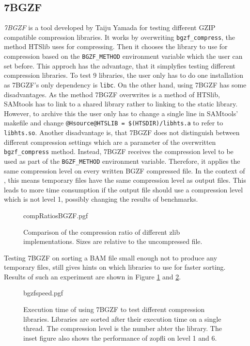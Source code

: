 \subsection{7BGZF}
\textit{7BGZF} \cite{yamada_7bgzf_2020} is a tool developed by Taiju Yamada for testing different GZIP compatible compression libraries. It works by overwriting \texttt{bgzf\_compress}, the method HTSlib uses for compressing. Then it chooses the library to use for compression based on the \texttt{BGZF\_METHOD} environment variable which the user can set before. This approch has the advantage, that it simplyfies testing different compression libraries. To test 9 libraries, the user only has to do one installation as 7BGZF's only dependency is \texttt{libc}. On the other hand, using 7BGZF has some disadvantages. As the method 7BGZF overwrites is a method of HTSlib, SAMtools has to link to a shared library rather to linking to the static library. However, to archive this the user only has to change a single line in SAMtools' makefile and change \texttt{@Hsource@HTSLIB = \$(HTSDIR)/libhts.a} to refer to \texttt{libhts.so}. Another disadvantage is, that 7BGZF does not distinguish between different compression settings which are a parameter of the overwritten \texttt{bgzf\_compress} method. Instead, 7BGZF receives the compression level to be used as part of the \texttt{BGZF\_METHOD} environment variable. Therefore, it applies the same compression level on every written BGZF compressed file. In the context of \sort, this means temporary files have the same compression level as output files. This leads to more time consumption if the output file should use a compression level which is not level 1, possibly changing the results of benchmarks. \\
\begin{figure}
        {compRatiosBGZF.pgf}
    \caption{Comparison of the compression ratio of different zlib implementations. Sizes are relative to the uncompressed file.}
    \label{fig:bgzfComps}
\end{figure}
Testing 7BGZF on sorting a BAM file small enough not to produce any temporary files, still gives hints on which libraries to use for faster sorting. Results of such an experiment are shown in Figure \ref{fig:bgzfComps} and \ref{fig:bgzfspeed}.

\begin{figure}[ht]
        {bgzfspeed.pgf}
    \caption{Execution time of \sort using 7BGZF to test different compression libraries. Libraries are sorted after their execution time on a single thread. The compression level is the number abter the library. The inset figure also shows the performance of zopfli on level 1 and 6.}
    \label{fig:bgzfspeed}
\end{figure}


